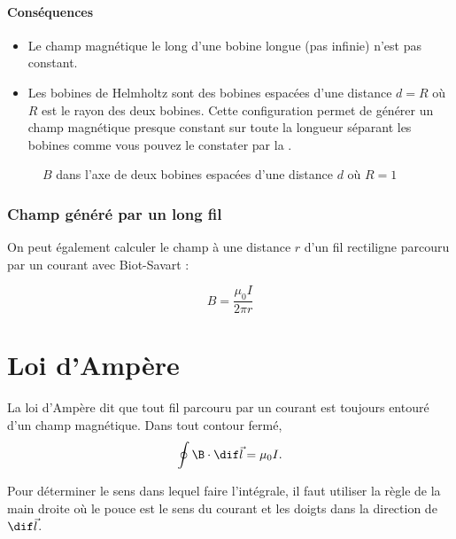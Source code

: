 \paragraph{Conséquences}
\begin{itemize}
  \item Le champ magnétique le long d'une bobine longue
    (pas infinie) n'est pas constant.
  \item Les bobines de Helmholtz sont des bobines espacées
    d'une distance $d = R$ où $R$ est le rayon des deux bobines.
    Cette configuration permet de générer un champ magnétique presque constant
    sur toute la longueur séparant les bobines
    comme vous pouvez le constater par la .
\end{itemize}
\begin{figure}
  \begin{center}
  \end{center}
  \caption{$B$ dans l'axe de deux bobines espacées d'une distance $d$ où $R=1$}
  \label{fig:deqr}
\end{figure}

\subsubsection{Champ généré par un long fil}
On peut également calculer le champ à une distance $r$ d'un fil rectiligne
parcouru par un courant avec Biot-Savart :

\[ B = \frac{\mu_0I}{2\pi r} \]

\section{Loi d'Ampère}
La loi d'Ampère dit que tout fil parcouru par un courant
est toujours entouré d'un champ magnétique.
Dans tout contour fermé,
\[ \oint \B \cdot \dif \vec l = \mu_0 I. \]

Pour déterminer le sens dans lequel faire l'intégrale,
il faut utiliser la règle de la main droite
où le pouce est le sens du courant
et les doigts dans la direction de $\dif\vec l$.

